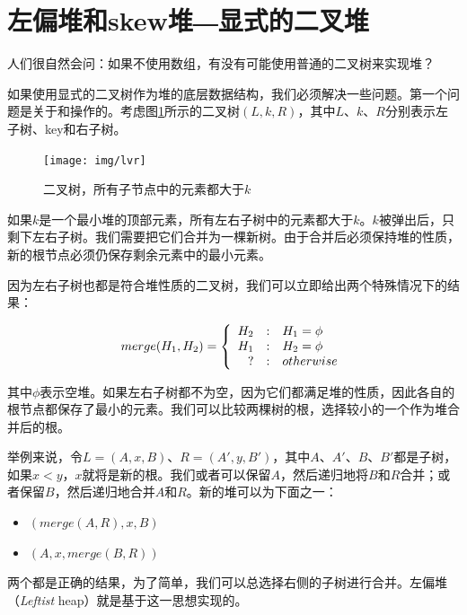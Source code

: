 \documentclass[b5paper]{ctexart}
\begin{document}
\section{左偏堆和skew堆―显式的二叉堆}
\label{ebheap}

人们很自然会问：如果不使用数组，有没有可能使用普通的二叉树来实现堆？

如果使用显式的二叉树作为堆的底层数据结构，我们必须解决一些问题。第一个问题是关于和操作的。考虑图\ref{fig:lvr}所示的二叉树$(L, k, R)$，其中$L$、$k$、$R$分别表示左子树、key和右子树。

\begin{figure}[htbp]
    \centering
    \texttt{[image: img/lvr]}
    \caption{二叉树，所有子节点中的元素都大于$k$} \label{fig:lvr}
\end{figure}

如果$k$是一个最小堆的顶部元素，所有左右子树中的元素都大于$k$。$k$被弹出后，只剩下左右子树。我们需要把它们合并为一棵新树。由于合并后必须保持堆的性质，新的根节点必须仍保存剩余元素中的最小元素。

因为左右子树也都是符合堆性质的二叉树，我们可以立即给出两个特殊情况下的结果：

\[
merge(H_1, H_2) = \left \{
  \begin{array}
  {r@{\quad:\quad}l}
  H_2 & H_1 = \phi \\
  H_1 & H_2 = \phi \\
  ? & otherwise
  \end{array}
\right.
\]

其中$\phi$表示空堆。如果左右子树都不为空，因为它们都满足堆的性质，因此各自的根节点都保存了最小的元素。我们可以比较两棵树的根，选择较小的一个作为堆合并后的根。

举例来说，令$L = (A, x, B)$、$R = (A', y, B')$，其中$A$、$A'$、$B$、$B'$都是子树，如果$x < y$，$x$就将是新的根。我们或者可以保留$A$，然后递归地将$B$和$R$合并；或者保留$B$，然后递归地合并$A$和$R$。新的堆可以为下面之一：

\begin{itemize}
\item $(merge(A, R), x, B)$
\item $(A, x, merge(B, R))$
\end{itemize}

两个都是正确的结果，为了简单，我们可以总选择右侧的子树进行合并。左偏堆（{\em Leftist} heap）就是基于这一思想实现的。
\end{document}
